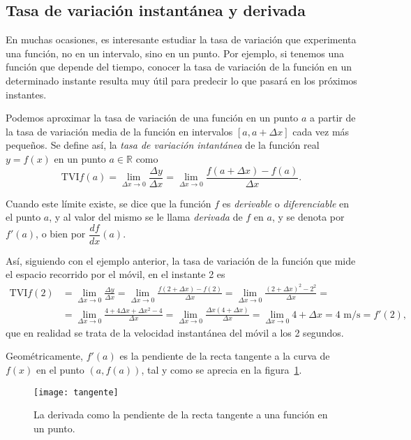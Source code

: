\documentclass[a4paper]{article}
\begin{document}
\subsection*{Tasa de variación instantánea y derivada}
En muchas ocasiones, es interesante estudiar la tasa de variación que experimenta una función, no en un intervalo, sino en un punto. Por ejemplo, si tenemos una función que depende del tiempo, conocer la tasa de variación de la función en un determinado instante resulta muy útil para predecir lo que pasará en los próximos instantes. 

Podemos aproximar la tasa de variación de una función en un punto $a$ a partir de la tasa de variación media de la función en intervalos $[a,a+\Delta x]$ cada vez más pequeños. Se define así, la \emph{tasa de variación intantánea} de la función real $y=f(x)$ en un punto $a\in \mathbb{R}$ como 
\[
\textrm{TVI} f(a)= \lim_{\Delta x\rightarrow 0}\frac{\Delta y}{\Delta x}=\lim_{\Delta x\rightarrow 0}\frac{f(a+\Delta x)-f(a)}{\Delta x}.
\]

Cuando este límite existe, se dice que la función $f$ es \emph{derivable} o \emph{diferenciable} en el punto $a$, y al valor del mismo se le llama \emph{derivada} de $f$ en $a$, y se denota por $f'(a)$, o bien por $\dfrac{df}{dx}(a)$.

Así, siguiendo con el ejemplo anterior, la tasa de variación de la función que mide el espacio recorrido por el móvil, en el instante 2 es
\begin{align*}
\textrm{TVI} f(2) &= \lim_{\Delta x\rightarrow 0}\frac{\Delta y}{\Delta x}=\lim_{\Delta x\rightarrow 0}\frac{f(2+\Delta x)-f(2)}{\Delta x}=\lim_{\Delta x\rightarrow 0}\frac{(2+\Delta x)^2-2^2}{\Delta x}=\\
&= 
\lim_{\Delta x\rightarrow 0}\frac{4+4\Delta x+\Delta x^2-4}{\Delta x}=\lim_{\Delta x\rightarrow 0}\frac{\Delta x(4+\Delta x)}{\Delta x}=\lim_{\Delta x\rightarrow 0} 4+\Delta x = 4\textrm{ m/s}=f'(2),
\end{align*}
que en realidad se trata de la velocidad instantánea del móvil a los 2 segundos.

Geométricamente, $f'(a)$ es la pendiente de la recta tangente a la curva de
$f(x)$ en el punto $(a,f(a))$, tal y como se aprecia en la
figura~\ref{g:tangente}.

\begin{figure}[h!]
\begin{center}
\texttt{[image: tangente]}
\caption{La derivada como la pendiente de la 
recta tangente a una función en un punto.}
\label{g:tangente}
\end{center}
\end{figure}
\end{document}
